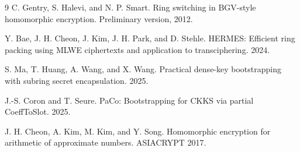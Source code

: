 \documentclass[UTF8,11pt]{article}
\theoremstyle{definition}
\theoremstyle{plain}
\begin{document}
\begin{thebibliography}{9}
C. Gentry, S. Halevi, and N. P. Smart. Ring switching in BGV-style homomorphic encryption. Preliminary version, 2012.

Y. Bae, J. H. Cheon, J. Kim, J. H. Park, and D. Stehle. HERMES: Efficient ring packing using MLWE ciphertexts and application to transciphering. 2024.

S. Ma, T. Huang, A. Wang, and X. Wang. Practical dense-key bootstrapping with subring secret encapsulation. 2025.

J.-S. Coron and T. Seure. PaCo: Bootstrapping for CKKS via partial CoeffToSlot. 2025.

J. H. Cheon, A. Kim, M. Kim, and Y. Song. Homomorphic encryption for arithmetic of approximate numbers. ASIACRYPT 2017.
\end{thebibliography}
\end{document}
